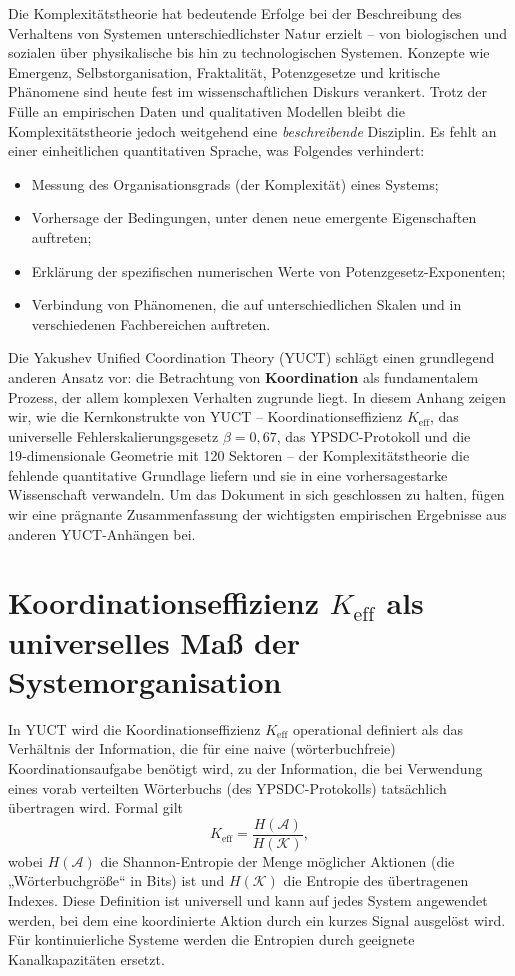 \documentclass[11pt]{article}
\theoremstyle{remark}
\newcommand{\Keff}{K_{\mathrm{eff}}}
\begin{document}
	Die Komplexitätstheorie hat bedeutende Erfolge bei der Beschreibung des Verhaltens von Systemen unterschiedlichster Natur erzielt – von biologischen und sozialen über physikalische bis hin zu technologischen Systemen. Konzepte wie Emergenz, Selbstorganisation, Fraktalität, Potenzgesetze und kritische Phänomene sind heute fest im wissenschaftlichen Diskurs verankert. Trotz der Fülle an empirischen Daten und qualitativen Modellen bleibt die Komplexitätstheorie jedoch weitgehend eine \emph{beschreibende} Disziplin. Es fehlt an einer einheitlichen quantitativen Sprache, was Folgendes verhindert:
	\begin{itemize}
		\item Messung des Organisationsgrads (der Komplexität) eines Systems;
		\item Vorhersage der Bedingungen, unter denen neue emergente Eigenschaften auftreten;
		\item Erklärung der spezifischen numerischen Werte von Potenzgesetz-Exponenten;
		\item Verbindung von Phänomenen, die auf unterschiedlichen Skalen und in verschiedenen Fachbereichen auftreten.
	\end{itemize}
	
	Die Yakushev Unified Coordination Theory (YUCT) schlägt einen grundlegend anderen Ansatz vor: die Betrachtung von \textbf{Koordination} als fundamentalem Prozess, der allem komplexen Verhalten zugrunde liegt. In diesem Anhang zeigen wir, wie die Kernkonstrukte von YUCT – Koordinationseffizienz \(\Keff\), das universelle Fehlerskalierungsgesetz \(\beta = 0,67\), das YPSDC-Protokoll und die 19‑dimensionale Geometrie mit 120 Sektoren – der Komplexitätstheorie die fehlende quantitative Grundlage liefern und sie in eine vorhersagestarke Wissenschaft verwandeln. Um das Dokument in sich geschlossen zu halten, fügen wir eine prägnante Zusammenfassung der wichtigsten empirischen Ergebnisse aus anderen YUCT-Anhängen bei.
	
	\section{Koordinationseffizienz \texorpdfstring{\(\Keff\)}{Keff} als universelles Maß der Systemorganisation}
	\label{sec:keff}
	
	In YUCT wird die Koordinationseffizienz \(\Keff\) operational definiert als das Verhältnis der Information, die für eine naive (wörterbuchfreie) Koordinationsaufgabe benötigt wird, zu der Information, die bei Verwendung eines vorab verteilten Wörterbuchs (des YPSDC-Protokolls) tatsächlich übertragen wird. Formal gilt
	\begin{equation}
		\Keff = \frac{H(\mathcal{A})}{H(\mathcal{K})},
	\end{equation}
	wobei \(H(\mathcal{A})\) die Shannon-Entropie der Menge möglicher Aktionen (die „Wörterbuchgröße“ in Bits) ist und \(H(\mathcal{K})\) die Entropie des übertragenen Indexes. Diese Definition ist universell und kann auf jedes System angewendet werden, bei dem eine koordinierte Aktion durch ein kurzes Signal ausgelöst wird. Für kontinuierliche Systeme werden die Entropien durch geeignete Kanalkapazitäten ersetzt.
	
\end{document}
